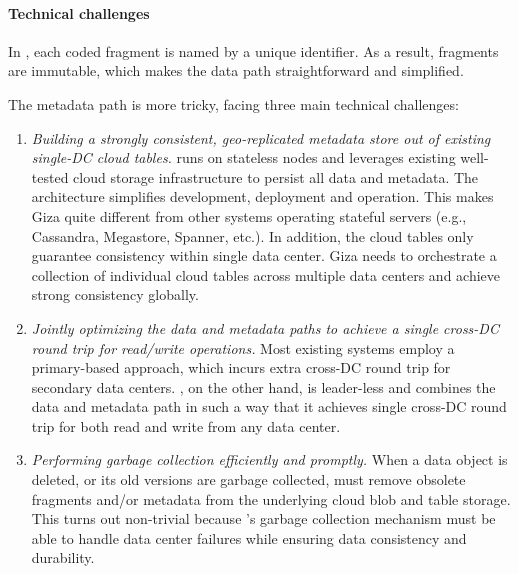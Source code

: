 \paragraph{Technical challenges}
In \name, each coded fragment is named by a unique identifier.
As a result, fragments are immutable, which makes the data path straightforward and simplified. 

The metadata path is more tricky, facing three main technical challenges:
\begin{enumerate}

\item {\it Building a strongly consistent, 
geo-replicated metadata store out of existing single-DC cloud tables.}
\name runs on stateless nodes and leverages existing well-tested
cloud storage infrastructure to persist all data and metadata.
The architecture simplifies development, deployment and operation.
This makes Giza quite different from other systems
operating stateful servers (e.g., Cassandra, Megastore, Spanner, etc.).
In addition, the cloud tables only guarantee consistency within single data center.
Giza needs to orchestrate a collection of individual cloud tables across multiple data centers
and achieve strong consistency globally.

\item {\it Jointly optimizing the data and metadata paths to achieve a single
  cross-DC round trip for read/write operations.}
Most existing systems employ a primary-based approach,
which incurs extra cross-DC round trip for secondary data centers.
\name, on the other hand, is leader-less and
combines the data and metadata path in such a way that it achieves
	single cross-DC round trip for both read and write from any data center.

\item {\it Performing garbage collection efficiently and promptly.} When a data
  object is deleted, or its old versions are garbage collected, \name must
  remove obsolete fragments and/or metadata from the underlying cloud blob
	and table storage.
	This turns out non-trivial because \name's
  garbage collection mechanism must be able to handle data center failures while
  ensuring data consistency and durability.

\end{enumerate}

